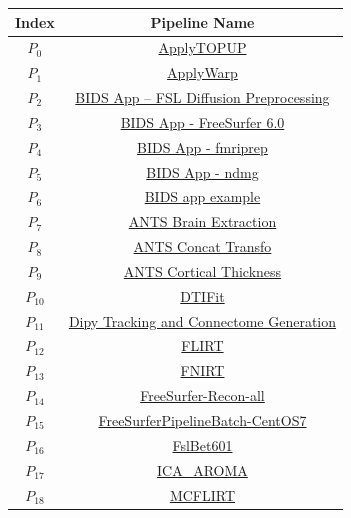 \documentclass[conference]{IEEEtran}
\begin{document}
\begin{table}
    \centering
    \begin{tabular}{cc}
        \hline
        Index & Pipeline Name  \\
        \hline 
        $P_{0}$ & \href{https://doi.org/10.5281/zenodo.2621487}{ApplyTOPUP} \\
        $P_{1}$ & \href{https://doi.org/10.5281/zenodo.2650440}{ApplyWarp}\\
        $P_{2}$ & \href{https://doi.org/10.5281/zenodo.2566455}{BIDS App -- FSL Diffusion Preprocessing}\\
        $P_{3}$ & \href{https://doi.org/10.5281/zenodo.1484547}{BIDS App - FreeSurfer 6.0}\\
        $P_{4}$ & \href{https://doi.org/10.5281/zenodo.1895219}{BIDS App - fmriprep}\\
        $P_{5}$ & \href{https://doi.org/10.5281/zenodo.4457865}{BIDS App - ndmg}\\
        $P_{6}$ & \href{https://doi.org/10.5281/zenodo.1451001}{BIDS app example}\\
        $P_{7}$ & \href{https://doi.org/10.5281/zenodo.2636973}{ANTS Brain Extraction}\\
        $P_{8}$ & \href{https://doi.org/10.5281/zenodo.2640953}{ANTS Concat Transfo}\\
        $P_{9}$ & \href{https://doi.org/10.5281/zenodo.2634608}{ANTS Cortical Thickness}\\
        $P_{10}$ & \href{https://doi.org/10.5281/zenodo.2601876}{DTIFit}\\
        $P_{11}$ & \href{https://doi.org/10.5281/zenodo.3699595}{Dipy Tracking and Connectome Generation}\\
        $P_{12}$ & \href{https://doi.org/10.5281/zenodo.2597643}{FLIRT}	\\
        $P_{13}$ & \href{https://doi.org/10.5281/zenodo.2639849}{FNIRT}	\\
        $P_{14}$ & \href{https://doi.org/10.5281/zenodo.4043546}{FreeSurfer-Recon-all}\\
        $P_{15}$ & \href{https://doi.org/10.5281/zenodo.1450997}{FreeSurferPipelineBatch-CentOS7}\\
        $P_{16}$ & \href{https://doi.org/10.5281/zenodo.3267250}{FslBet601}	\\
        $P_{17}$ & \href{https://doi.org/10.5281/zenodo.1445789}{ICA\_AROMA}	\\
        $P_{18}$ & \href{https://doi.org/10.5281/zenodo.2602109}{MCFLIRT}	\\

\end{tabular}
\end{table}
\end{document}
